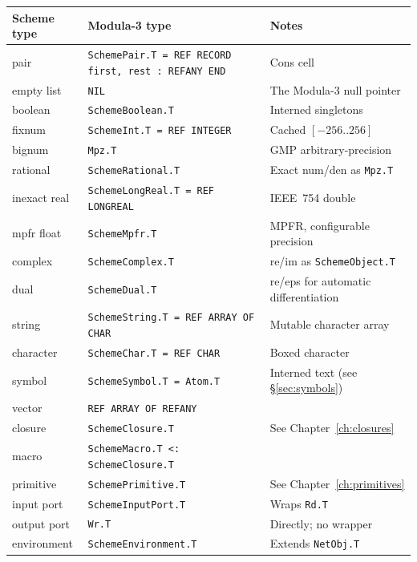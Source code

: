 \documentclass[12pt]{report}
\begin{document}
\begin{center}
\begin{longtable}{lll}
\toprule
\textbf{Scheme type} & \textbf{Modula-3 type} & \textbf{Notes} \\
\midrule
\endhead
pair & \texttt{SchemePair.T = REF RECORD first, rest : REFANY END}
     & Cons cell \\
empty list & \texttt{NIL}
           & The Modula-3 null pointer \\
boolean & \texttt{SchemeBoolean.T}
        & Interned singletons \\
fixnum & \texttt{SchemeInt.T = REF INTEGER}
       & Cached $[-256..256]$ \\
bignum & \texttt{Mpz.T}
       & GMP arbitrary-precision \\
rational & \texttt{SchemeRational.T}
         & Exact num/den as \texttt{Mpz.T} \\
inexact real & \texttt{SchemeLongReal.T = REF LONGREAL}
             & IEEE~754 double \\
mpfr float & \texttt{SchemeMpfr.T}
           & MPFR, configurable precision \\
complex & \texttt{SchemeComplex.T}
        & re/im as \texttt{SchemeObject.T} \\
dual & \texttt{SchemeDual.T}
     & re/eps for automatic differentiation \\
string & \texttt{SchemeString.T = REF ARRAY OF CHAR}
       & Mutable character array \\
character & \texttt{SchemeChar.T = REF CHAR}
          & Boxed character \\
symbol & \texttt{SchemeSymbol.T = Atom.T}
       & Interned text (see \S\ref{sec:symbols}) \\
vector & \texttt{REF ARRAY OF REFANY}
       & \\
closure & \texttt{SchemeClosure.T}
        & See Chapter~\ref{ch:closures} \\
macro & \texttt{SchemeMacro.T <: SchemeClosure.T}
      & \\
primitive & \texttt{SchemePrimitive.T}
          & See Chapter~\ref{ch:primitives} \\
input port & \texttt{SchemeInputPort.T}
           & Wraps \texttt{Rd.T} \\
output port & \texttt{Wr.T}
            & Directly; no wrapper \\
environment & \texttt{SchemeEnvironment.T}
            & Extends \texttt{NetObj.T} \\
\bottomrule
\end{longtable}
\end{center}
\end{document}
